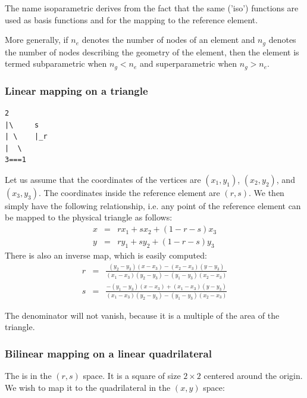
The name isoparametric derives from the fact that the same ('iso') 
functions are used as basis functions and for the mapping to the reference element.

More generally, if $n_e$ denotes the number of nodes of an element and $n_g$ denotes the 
number of nodes describing the geometry of the element, 
then the element is termed subparametric when $n_g<n_e$ and 
superparametric when $n_g>n_e$.
 

\subsubsection{Linear mapping on a triangle}

\begin{verbatim}
2
|\     s
| \    |_r
|  \
3===1
\end{verbatim}

Let us assume that the coordinates of the vertices are 
$(x_1,y_1)$,  
$(x_2,y_2)$, and 
$(x_3,y_3)$.
The coordinates inside the reference element are $(r,s)$. We then simply have the 
following relationship, i.e. any point of the reference element 
can be mapped to the physical triangle as follows:
\begin{eqnarray}
x&=& r x_1 + s x_2 + (1-r-s) x_3 \\
y&=& r y_1 + s y_2 + (1-r-s) y_3 
\end{eqnarray} 
There is also an inverse map, which is easily computed:
\begin{eqnarray}
r&=& \frac{(y_2-y_3)(x-x_3)-(x_2-x_3)(y-y_3)}{(x_1-x_3)(y_2-y_3)-(y_1-y_3)(x_2-x_3)} \\
s&=& \frac{-(y_1-y_3)(x-x_3)+(x_1-x_3)(y-y_3)}{(x_1-x_3)(y_2-y_3)-(y_1-y_3)(x_2-x_3)} 
\end{eqnarray} 
\begin{remark}
The denominator will not vanish, because it is a multiple of the area of the triangle.
\end{remark}

\subsubsection{Bilinear mapping on a linear quadrilateral}

The  is in the $(r,s)$ space. It is a square of size $2\times2$ 
centered around the origin. We wish to map it to the quadrilateral in the $(x,y)$ space:

